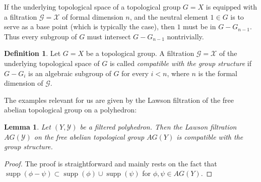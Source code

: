 \documentclass{amsart}
\newtheorem{lemma}[thm]{Lemma}
\theoremstyle{definition}
\newtheorem{defn}[thm]{Definition}
\theoremstyle{remark}
\newcommand {\Ga}    {\ensuremath{\mbox{$\mathcal{G}$}}}
\newcommand {\Xa}    {\ensuremath{\mathcal{X}}}
\newcommand {\Ya}    {\ensuremath{\mathcal{Y}}}
\newcommand {\supp}  {\ensuremath{\operatorname{supp}}}
\begin{document}
If the underlying topological space of
a topological group $G=X$ is equipped with a filtration $\Ga = \Xa$ of formal
dimension $n$,
and the neutral element $1\in G$ is to serve as a base point (which is typically the case),
then $1$ must be in $G-G_{n-1}$. Thus every subgroup of $G$ must intersect
$G-G_{n-1}$ nontrivially.
\begin{defn}
Let $G=X$ be a topological group. A filtration $\Ga = \Xa$ of the underlying
topological space of $G$ is called \emph{compatible with the group structure}
if $G-G_i$ is an algebraic subgroup of $G$ for every $i<n$, where $n$
is the formal dimension of $\Ga$.
\end{defn}
The examples relevant for us are given by the Lawson filtration of the free 
abelian topological group on a polyhedron:
\begin{lemma} \label{lem.lawsonfiltriscompatible}
Let $(Y,\Ya)$ be a filtered polyhedron.
Then the Lawson filtration $AG(\Ya)$ on the free abelian topological group
$AG(Y)$ is compatible with the group structure.
\end{lemma}
\begin{proof}
The proof is straightforward and mainly rests on the fact that
$\supp (\phi - \psi) \subset \supp (\phi) \cup \supp (\psi)$
for $\phi, \psi \in AG(Y)$.
\end{proof}
\end{document}
